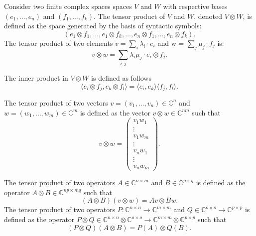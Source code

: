 \begin{definition}
Consider two finite complex spaces spaces $V$ and $W$ with respective bases $(e_1, \ldots , e_n)$ and $(f_1, \ldots , f_k)$. The tensor product of $V$ and $W$, denoted $V \otimes W$, is defined as the space generated by the basis of syntactic symbols:
\begin{equation*}
  (e_1 \otimes f_1, \ldots , e_1 \otimes f_k, \ldots , e_n \otimes f_1, \ldots , e_n \otimes f_k).
\end{equation*}
The tensor product of two elements $v = \sum_i \lambda_i \cdot e_i$ and w = $\sum_j \mu_j \cdot f_j$ is:
\begin{equation*}
  v \otimes w = \sum_{i,j} \lambda_i \mu_j \cdot e_i \otimes f_j.
\end{equation*}
\end{definition}

The inner product in $V \otimes W$ is defined as follows 
\begin{equation*}
  \langle e_i \otimes f_j, e_k \otimes f_l \rangle = \langle e_i, e_k \rangle \langle f_j, f_l \rangle.
\end{equation*}

The tensor product of two vectors $v = (v_1, \ldots, v_n)\in \mathbb{C}^{n}$ and $w = (w_1, \ldots, w_m) \in \mathbb{C}^{m}$ is defined as the vector $v \otimes w \in \mathbb{C}^{nm}$ such that
\begin{equation*}
  v \otimes w = \begin{pmatrix} v_1 w_1 \\ \vdots \\ v_1 w_m \\ \vdots \\ v_n w_1 \\ \vdots \\ v_n w_m \end{pmatrix}.
\end{equation*}

The tensor product of two operators $A \in \mathbb{C}^{n \times m}$ and $B \in \mathbb{C}^{p \times q}$ is defined as the operator $A \otimes B \in \mathbb{C}^{np \times mq}$ such that
\begin{equation*}
  (A \otimes B)(v \otimes w) = Av \otimes Bw.
\end{equation*}
The tensor product of two operators $P: \mathbb{C}^{n \times n} \rightarrow \mathbb{C}^{m \times m} $ and $Q \in \mathbb{C}^{o \times o} \rightarrow \mathbb{C}^{p \times p}$ is defined as the operator $ P \otimes Q \in  \mathbb{C}^{n \times n} \otimes \mathbb{C}^{o \times o} \rightarrow \mathbb{C}^{m \times m} \otimes \mathbb{C}^{p \times p}   $ such that
\begin{equation*}
  (P \otimes Q)(A \otimes B) = P (A) \otimes Q(B).
\end{equation*}

